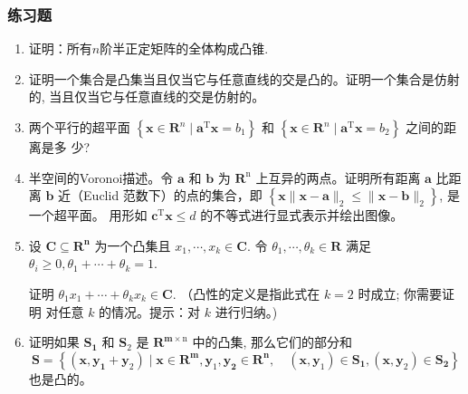 \documentclass[handout]{beamer}
\begin{document}
\begin{frame}[allowframebreaks]
  \frametitle{练习题 }

  \begin{enumerate}
    \item  证明：所有$n$阶半正定矩阵的全体构成凸锥.

    \item 证明一个集合是凸集当且仅当它与任意直线的交是凸的。证明一个集合是仿射 的, 当且仅当它与任意直线的交是仿射的。

    \item 两个平行的超平面 $\left\{\mathbf{x} \in \mathbf{R}^{n} \mid \mathbf{a}^{\mathrm{T}} \mathbf{x}=b_{1}\right\}$ 和 $\left\{\mathbf{x} \in \mathbf{R}^{n} \mid \mathbf{a}^{\mathrm{T}} \mathbf{x}=b_{2}\right\}$ 之间的距离是多 少?

       \item  半空间的Voronoi描述。令 $\mathbf{a}$ 和 $\mathbf{b}$ 为 $\mathbf{R}^{\mathrm{n}}$ 上互异的两点。证明所有距离 $\mathbf{a}$ 比距离 $\mathbf{b}$ 近（Euclid 范数下）的点的集合，即 $\left\{\mathbf{x}\|\mathbf{x}-\mathbf{a}\|_{2} \leq\|\mathbf{x}-\mathbf{b}\|_{2}\right\}$, 是一个超平面。 用形如 $\mathbf{c}^{\mathrm{T}} \mathbf{x} \leq d$ 的不等式进行显式表示并绘出图像。

   \item   设 $\mathbf{C} \subseteq \mathbf{R}^{\mathbf{n}}$ 为一个凸集且 $x_{1}, \cdots, x_{k} \in \mathbf{C} .$
     令 $\theta_{1}, \cdots, \theta_{k} \in \boldsymbol{R}$ 满足 $\theta_{i} \geq 0, \theta_{1}+\cdots+\theta_{k}=1$.

  证明 $\theta_{1} x_{1}+\cdots+\theta_{k} x_{k} \in \mathbf{C}$. （凸性的定义是指此式在 $k=2$ 时成立; 你需要证明 对任意 $k$ 的情况。提示：对 $k$ 进行归纳。)

  \item  证明如果 $\mathbf{S}_{\mathbf{1}}$ 和 $\mathbf{S}_{2}$ 是 $\mathbf{R}^{\mathbf{m} \times \mathrm{n}}$ 中的凸集, 那么它们的部分和
$$
\mathbf{S}=\left\{\left(\mathbf{x}, \mathbf{y}_{\mathbf{1}}+\mathbf{y}_{2}\right) \mid \mathbf{x} \in \mathbf{R}^{\mathbf{m}}, \mathbf{y}_{1}, \mathbf{y}_{\mathbf{2}} \in \mathbf{R}^{\mathbf{n}}, \quad\left(\mathbf{x}, \mathbf{y}_{1}\right) \in \mathbf{S}_{\mathbf{1}},\left(\mathbf{x}, \mathbf{y}_{2}\right) \in \mathbf{S}_{\mathbf{2}}\right\}
$$
也是凸的。




\end{enumerate}
\end{frame}
\end{document}
